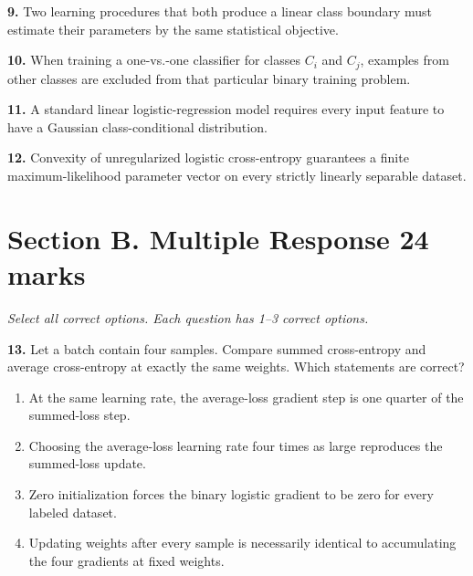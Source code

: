 \documentclass[11pt,a4paper]{article}
\begin{document}
\par\noindent\begin{minipage}{\linewidth}
\textbf{9.} Two learning procedures that both produce a linear class boundary must estimate their parameters by the same statistical objective.
\end{minipage}\par\vspace{3mm}
\par\noindent\begin{minipage}{\linewidth}
\textbf{10.} When training a one-vs.-one classifier for classes \(C_i\) and \(C_j\), examples from other classes are excluded from that particular binary training problem.
\end{minipage}\par\vspace{3mm}
\par\noindent\begin{minipage}{\linewidth}
\textbf{11.} A standard linear logistic-regression model requires every input feature to have a Gaussian class-conditional distribution.
\end{minipage}\par\vspace{3mm}
\par\noindent\begin{minipage}{\linewidth}
\textbf{12.} Convexity of unregularized logistic cross-entropy guarantees a finite maximum-likelihood parameter vector on every strictly linearly separable dataset.
\end{minipage}\par\vspace{3mm}
\newpage\section*{Section B. Multiple Response \hfill 24 marks}
\textit{Select all correct options. Each question has 1--3 correct options.}\par
\par\noindent\begin{minipage}{\linewidth}
\textbf{13.} Let a batch contain four samples. Compare summed cross-entropy and average cross-entropy at exactly the same weights. Which statements are correct?
\begin{enumerate}[label=(\Alph*),leftmargin=8mm,itemsep=2pt,topsep=2pt]
\item At the same learning rate, the average-loss gradient step is one quarter of the summed-loss step.
\item Choosing the average-loss learning rate four times as large reproduces the summed-loss update.
\item Zero initialization forces the binary logistic gradient to be zero for every labeled dataset.
\item Updating weights after every sample is necessarily identical to accumulating the four gradients at fixed weights.
\end{enumerate}

\end{minipage}\par\vspace{3mm}
\end{document}
